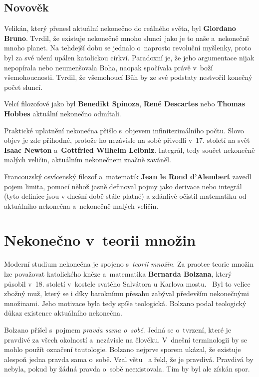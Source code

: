 \documentclass[czech]{article}
\begin{document}
\subsection*{Novověk}

Velikán, který přenesl aktuální nekonečno do reálného světa, byl  \textbf{Giordano Bruno}.
Tvrdil, že existuje nekonečně mnoho sluncí~jako je to naše a~nekonečně mnoho planet. Na tehdejší dobu se jednalo o~naprosto revoluční myšlenky, proto byl za své učení upálen katolickou církví. Paradoxní je, že jeho argumentace nijak nepopírala nebo neumenšovala Boha, naopak spočívala právě v~boží všemohoucnosti. Tvrdil, že všemohoucí Bůh by ze své podstaty nestvořil konečný počet sluncí. 

Velcí filozofové jako byl \textbf{Benedikt Spinoza}, \textbf{René Descartes} nebo \textbf{Thomas Hobbes} aktuální nekonečno odmítali.~\cite{vopenka_infinitni_mateatika}

Praktické uplatnění nekonečna přišlo s~objevem infinitezimálního počtu. Slovo objev je zde příhodné, protože ho nezávisle na sobě přivedli v~17. století na svět \textbf{Isaac Newton} a~\textbf{Gottfried Wilhelm Leibniz}.
Integrál, tedy součet nekonečně malých veličin, aktuálním nekonečnem značně zaváněl.

Francouzský osvícenský filozof a~matematik \textbf{Jean le Rond d’Alembert} zavedl pojem limita, pomocí něhož jasně definoval pojmy jako derivace nebo integrál (tyto definice jsou v dnešní době stále platné) a zdánlivě očistil matematiku od aktuálního nekonečna a~nekonečně malých veličin.


\section*{Nekonečno v~teorii množin}
Moderní studium nekonečna je spojeno s~\textit{teorií množin}. Za praotce teorie množin lze považovat katolického kněze a~matematika \textbf{Bernarda Bolzana}, který působil v~18. století v~kostele svatého Salvátora u Karlova mostu.~\cite{salvator} Byl to velice zbožný muž, který se i díky baroknímu přesahu zabýval především nekonečnými množinami. Jeho motivace byla tedy spíše teologická. 
Bolzano podal teologický důkaz existence aktuálního nekonečna.

Bolzano přišel s~pojmem \textit{pravda sama o~sobě}. Jedná se o~tvrzení, které je pravdivé za všech okolností a~nezávisle na člověku. V~dnešní terminologii by se mohlo použít označení tautologie. 
Bolzano nejprve sporem ukázal, že existuje alespoň jedna pravda sama o~sobě. Vzal větu ~a řekl, že je pravdivá. Pravdivá by nebyla, pokud by žádná pravda o~sobě neexistovala. Tím by byl ale získán spor. 
\end{document}

